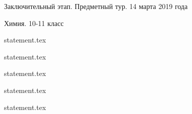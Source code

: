 \documentclass[a4paper,11pt, oneside]{book}
\begin{document}
\vspace{-3mm}
\vspace{-5mm}

\normalsize

\begin{center}
    Заключительный этап. Предметный тур. 14 марта 2019 года
    
    Химия. 10-11 класс
\end{center}

\parindent=0cm

{statement.tex}

{statement.tex}

{statement.tex}

{statement.tex}

\newpage

{statement.tex}
\end{document}
